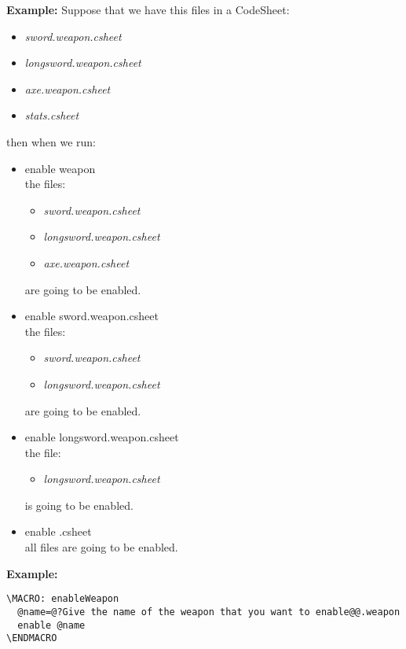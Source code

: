 \documentclass[11pt,a4paper,openright,oneside]{book}
\newenvironment{ex}
{
  \setlength{\parindent}{0cm}
  \large \textbf{Example:} \normalsize 
}
{}
\begin{document}
\begin{ex} Suppose that we have this files in a CodeSheet:
  \begin{itemize} 
    \item \textit{sword.weapon.csheet}
    \item \textit{longsword.weapon.csheet}
    \item \textit{axe.weapon.csheet}
    \item \textit{stats.csheet}
  \end{itemize}
then when we run:
    \begin{itemize}
      \item \textsf{enable weapon} \\
      the files:
        \begin{itemize}
          \item \textit{sword.weapon.csheet}
          \item \textit{longsword.weapon.csheet}
          \item \textit{axe.weapon.csheet}
        \end{itemize}
      are going to be enabled.
      \item \textsf{enable sword.weapon.csheet} \\
      the files:
        \begin{itemize}
          \item \textit{sword.weapon.csheet}
          \item \textit{longsword.weapon.csheet}
        \end{itemize}
      are going to be enabled.
      \item \textsf{enable longsword.weapon.csheet} \\
      the file:
        \begin{itemize}
          \item \textit{longsword.weapon.csheet}
        \end{itemize}
      is going to be enabled.
      \item \textsf{enable .csheet} \\
      all files are going to be enabled.
  \end{itemize}
\end{ex}

\begin{ex}
  \begin{lstlisting}
\MACRO: enableWeapon
  @name=@?Give the name of the weapon that you want to enable@@.weapon
  enable @name
\ENDMACRO
  \end{lstlisting}
\end{ex}
\end{document}
